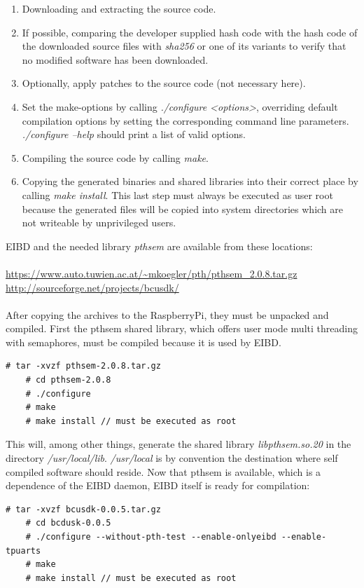 \begin{enumerate}
 \item Downloading and extracting the source code.
 \item If possible, comparing the developer supplied hash code  with the hash code of the downloaded source files with
 \textit{sha256} or one of its variants to verify that no modified software has been downloaded.
 \item Optionally, apply patches to the source code (not necessary here).
 \item Set the make-options by calling \textit{./configure <options>}, overriding default compilation options by setting the corresponding command line parameters.
 \textit{./configure --help} should print a list of valid options.
 \item Compiling the source code by calling \textit{make}.
 \item Copying the generated binaries and shared libraries into their correct place by calling \textit{make install}. This last step must always be executed
 as user root because the generated files will be copied into system directories which are not writeable by unprivileged users.
\end{enumerate}
EIBD and the needed library \textit{pthsem} are available from these locations:
\\
\\
\url{https://www.auto.tuwien.ac.at/~mkoegler/pth/pthsem_2.0.8.tar.gz}\\
\url{http://sourceforge.net/projects/bcusdk/}
\\
\\
After copying the archives to the RaspberryPi, they must be unpacked and compiled. First the pthsem shared library, which offers user mode multi
threading with semaphores, must be compiled because it is used by EIBD. 
\begin{lstlisting}[style=BashInputStyle]
    # tar -xvzf pthsem-2.0.8.tar.gz
    # cd pthsem-2.0.8
    # ./configure
    # make
    # make install // must be executed as root
\end{lstlisting}
This will, among other things, generate the shared library \textit{libpthsem.so.20} in the directory \textit{/usr/local/lib}. \textit{/usr/local}
 is by convention the destination where self compiled software should reside.
Now that pthsem is available, which is a dependence of the EIBD daemon, EIBD itself is ready for compilation:

\begin{lstlisting}[style=BashInputStyle]
    # tar -xvzf bcusdk-0.0.5.tar.gz
    # cd bcdusk-0.0.5
    # ./configure --without-pth-test --enable-onlyeibd --enable-tpuarts
    # make
    # make install // must be executed as root
\end{lstlisting}

